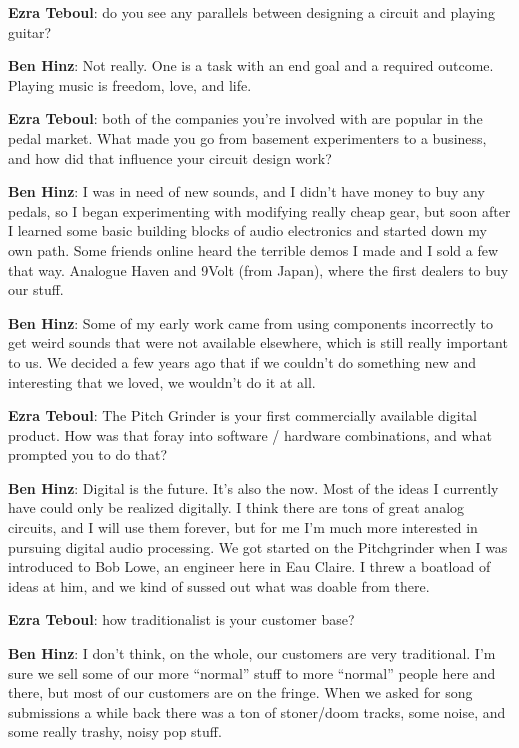 \textbf{Ezra Teboul}: do you see any parallels between designing a circuit and playing guitar? 

\textbf{Ben Hinz}: Not really. One is a task with an end goal and a required outcome. Playing music is freedom, love, and life.

\textbf{Ezra Teboul}: both of the companies you're involved with are popular in the pedal market. What made you go from basement experimenters to a business, and how did that influence your circuit design work? 

\textbf{Ben Hinz}: I was in need of new sounds, and I didn't have money to buy any pedals, so I began experimenting with modifying really cheap gear, but soon after I learned some basic building blocks of audio electronics and started down my own path. Some friends online heard the terrible demos I made and I sold a few that way. Analogue Haven and 9Volt (from Japan), where the first dealers to buy our stuff. 

\textbf{Ben Hinz}: Some of my early work came from using components incorrectly to get  weird sounds that were not available elsewhere, which is still really important to us. We decided a few years ago that if we couldn’t do something new and interesting that we loved, we wouldn’t do it at all. 

\textbf{Ezra Teboul}: The Pitch Grinder is your first commercially available digital product. How was that foray into software / hardware combinations, and what prompted you to do that? 

\textbf{Ben Hinz}: Digital is the future. It's also the now. Most of the ideas I currently have could only be realized digitally. I think there are tons of great analog circuits, and I will use them forever, but for me I'm much more interested in pursuing digital audio processing. We got started on the Pitchgrinder when I was introduced to Bob Lowe, an engineer here in Eau Claire. I threw a boatload of ideas at him, and we kind of sussed out what was doable from there.

\textbf{Ezra Teboul}: how traditionalist is your customer base? 

\textbf{Ben Hinz}: I don't think, on the whole, our customers are very traditional. I'm sure we sell some of our more ``normal'' stuff to more ``normal'' people here and there, but most of our customers are on the fringe. When we asked for song submissions a while back there was a ton of stoner/doom tracks, some noise, and some really trashy, noisy pop stuff.  

